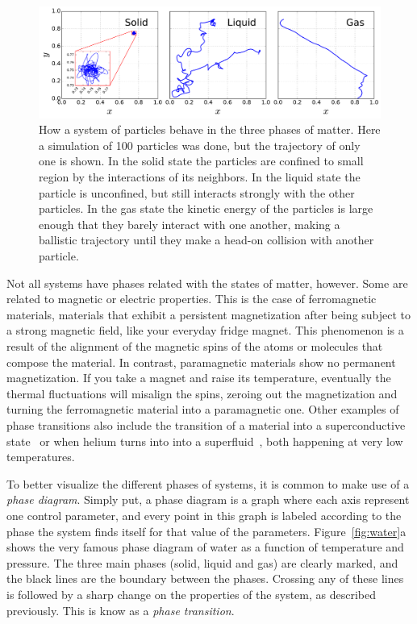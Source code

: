 \begin{figure}[t]
\begin{center}
    \includegraphics[width=\textwidth]{chapters/ch2-crit/figs/phases}
\end{center}
\caption{How a system of particles behave in the three phases of matter. Here a
    simulation of 100 particles was done, but the trajectory of only one is
    shown. In the solid state the particles are confined to small region by
    the interactions of its neighbors. In the liquid state the particle is
    unconfined, but still interacts strongly with the other particles. In the
    gas state the kinetic energy of the particles is large enough that they
    barely interact with one another, making a ballistic trajectory until
    they make a head-on collision with another particle.}
\label{fig:phases}
\end{figure}

Not all systems have phases related with the states of matter, however. Some
are related to magnetic or electric properties. This is the case of
ferromagnetic materials, materials that exhibit a persistent magnetization
after being subject to a strong magnetic field, like your everyday fridge
magnet. This phenomenon is a result of the alignment of the magnetic spins of
the atoms or molecules that compose the material. In contrast, paramagnetic
materials show no permanent magnetization. If you take a magnet and raise its
temperature, eventually the thermal fluctuations will misalign the spins,
zeroing out the magnetization and turning the ferromagnetic material into a
paramagnetic one. Other examples of phase transitions also include the
transition of a material into a superconductive state~\cite{Fisher1991} or when
helium turns into into a superfluid~\cite{Campostrini2006}, both happening at
very low temperatures.

To better visualize the different phases of systems, it is common to make use
of a \textit{phase diagram}. Simply put, a phase diagram is a graph where each
axis represent one control parameter, and every point in this graph is labeled
according to the phase the system finds itself for that value of the
parameters. Figure~\ref{fig:water}a shows the very famous phase diagram of
water as a function of temperature and pressure. The three main phases (solid,
liquid and gas) are clearly marked, and the black lines are the boundary
between the phases. Crossing any of these lines is followed by a sharp change
on the properties of the system, as described previously. This is know as a
\textit{phase transition}.


